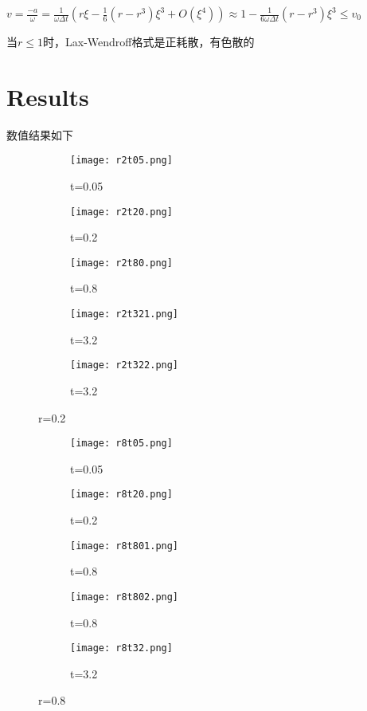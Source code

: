 \documentclass{article}
\begin{document}
$v=\frac{-a}{\omega}=\frac{1}{\omega \Delta t}(r \xi-\frac{1}{6} \left(r-r^3\right) \xi^3+O\left(\xi^4\right))
    \approx 1-\frac{1}{6 \omega \Delta t}(r-r^3)\xi^3\leq v_0$

当$r\leq 1$时，Lax-Wendroff格式是正耗散，有色散的
\section{Results}

数值结果如下
\begin{figure}[htbp]
    \centering
    \begin{subfigure}[b]{0.47\textwidth}
        \centering
        \texttt{[image: r2t05.png]}
        \caption{t=0.05}
    \end{subfigure}
    \begin{subfigure}[b]{0.47\textwidth}
        \centering
        \texttt{[image: r2t20.png]}
        \caption{t=0.2}
    \end{subfigure}
    \begin{subfigure}[b]{0.47\textwidth}
        \centering
        \texttt{[image: r2t80.png]}
        \caption{t=0.8}
    \end{subfigure}
    \begin{subfigure}[b]{0.47\textwidth}
        \centering
        \texttt{[image: r2t321.png]}
        \caption{t=3.2}
    \end{subfigure}
    \begin{subfigure}[b]{0.47\textwidth}
        \centering
        \texttt{[image: r2t322.png]}
        \caption{t=3.2}
    \end{subfigure}
    \caption{r=0.2}
    \label{fig:r=0.2}
\end{figure}

\begin{figure}[H]
    \centering
    \begin{subfigure}[b]{0.47\textwidth}
        \centering
        \texttt{[image: r8t05.png]}
        \caption{t=0.05}
    \end{subfigure}
    \begin{subfigure}[b]{0.47\textwidth}
        \centering
        \texttt{[image: r8t20.png]}
        \caption{t=0.2}
    \end{subfigure}
    \begin{subfigure}[b]{0.47\textwidth}
        \centering
        \texttt{[image: r8t801.png]}
        \caption{t=0.8}
    \end{subfigure}
    \begin{subfigure}[b]{0.47\textwidth}
        \centering
        \texttt{[image: r8t802.png]}
        \caption{t=0.8}
    \end{subfigure}
    \begin{subfigure}[b]{0.47\textwidth}
        \centering
        \texttt{[image: r8t32.png]}
        \caption{t=3.2}
    \end{subfigure}
    \caption{r=0.8}
    \label{fig:r=0.8}
\end{figure}
\end{document}
